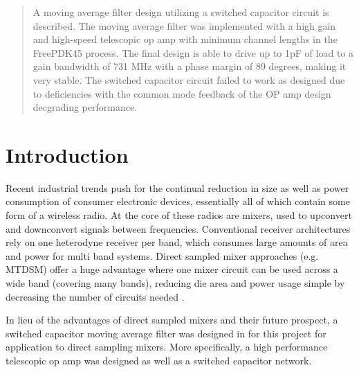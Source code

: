 \documentclass[conference]{IEEEtran}
\begin{document}
\begin{abstract}
A moving average filter design utilizing a switched capacitor circuit is described. The moving average filter was implemented with a high gain and high-speed telescopic op amp with minimum channel lengths in the FreePDK45 process. The final design is able to drive up to 1pF of load to a gain bandwidth of 731 MHz with a phase margin of 89 degrees, making it very stable. The switched capacitor circuit failed to work as designed due to deficiencies with the common mode feedback of the OP amp design decgrading performance.
\end{abstract}





%
\IEEEpeerreviewmaketitle



\section{Introduction}
Recent industrial trends push for the continual reduction in size as well as power consumption of consumer electronic devices, essentially all of which contain some form of a wireless radio. At the core of these radios are mixers, used to upconvert and downconvert signals between frequencies. Conventional receiver architectures rely on one heterodyne receiver per band, which consumes large amounts of area and power for multi band systems. Direct sampled mixer approaches (e.g. MTDSM) offer a huge advantage where one mixer circuit can be used across a wide band (covering many bands), reducing die area and power usage simple by decreasing the number of circuits needed \cite{IEEEhowto:new}.\par
 
In lieu of the advantages of direct sampled mixers and their future prospect, a switched capacitor moving average filter was designed in for this project for application to direct sampling mixers. More specifically, a high performance telescopic op amp was designed as well as a switched capacitor network.
\end{document}
